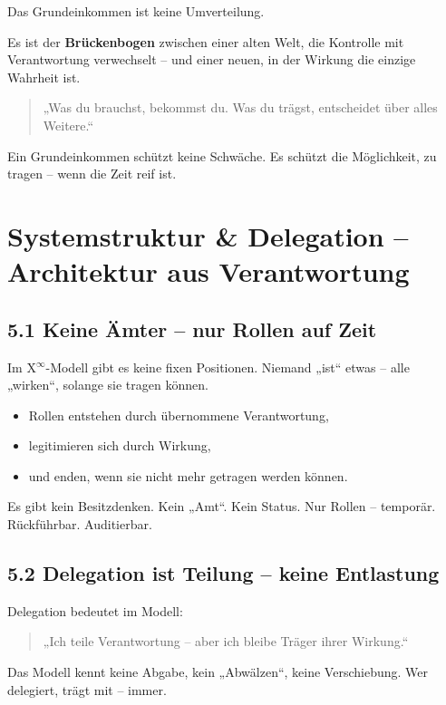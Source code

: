 \documentclass[12pt,a4paper]{book}
\begin{document}
Das Grundeinkommen ist keine Umverteilung.

Es ist der \textbf{Brückenbogen} zwischen einer alten Welt,  
die Kontrolle mit Verantwortung verwechselt –  
und einer neuen, in der Wirkung die einzige Wahrheit ist.

\begin{quote}
„Was du brauchst, bekommst du.  
Was du trägst, entscheidet über alles Weitere.“  
\end{quote}

Ein Grundeinkommen schützt keine Schwäche.  
Es schützt die Möglichkeit, zu tragen – wenn die Zeit reif ist.

\chapter{Systemstruktur \& Delegation – Architektur aus Verantwortung}

\section*{5.1 Keine Ämter – nur Rollen auf Zeit}

Im X$^\infty$-Modell gibt es keine fixen Positionen.  
Niemand „ist“ etwas – alle „wirken“, solange sie tragen können.

\begin{itemize}
    \item Rollen entstehen durch übernommene Verantwortung,
    \item legitimieren sich durch Wirkung,
    \item und enden, wenn sie nicht mehr getragen werden können.
\end{itemize}

Es gibt kein Besitzdenken. Kein „Amt“. Kein Status.  
Nur Rollen – temporär. Rückführbar. Auditierbar.

\section*{5.2 Delegation ist Teilung – keine Entlastung}

Delegation bedeutet im Modell:

\begin{quote}
„Ich teile Verantwortung – aber ich bleibe Träger ihrer Wirkung.“  
\end{quote}

Das Modell kennt keine Abgabe, kein „Abwälzen“, keine Verschiebung.  
Wer delegiert, trägt mit – immer.
\end{document}
